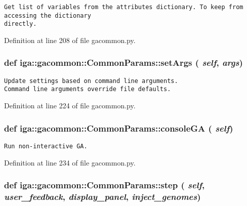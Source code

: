 \footnotesize\begin{verbatim}
Get list of variables from the attributes dictionary. To keep from accessing the dictionary
directly.
\end{verbatim}
\normalsize
 

Definition at line 208 of file gacommon.py.
\subsubsection{\setlength{\rightskip}{0pt plus 5cm}def iga::gacommon::CommonParams::setArgs ( {\em self},  {\em args})}\label{classiga_1_1gacommon_1_1CommonParams_608db5632cdf4b3b8d23e0d9f56b77be}




\footnotesize\begin{verbatim}
Update settings based on command line arguments.
Command line arguments override file defaults.
\end{verbatim}
\normalsize
 

Definition at line 224 of file gacommon.py.
\subsubsection{\setlength{\rightskip}{0pt plus 5cm}def iga::gacommon::CommonParams::consoleGA ( {\em self})}\label{classiga_1_1gacommon_1_1CommonParams_d12a76bc5f7fac648214ad898aaa0d38}




\footnotesize\begin{verbatim}
Run non-interactive GA.
\end{verbatim}
\normalsize
 

Definition at line 234 of file gacommon.py.
\subsubsection{\setlength{\rightskip}{0pt plus 5cm}def iga::gacommon::CommonParams::step ( {\em self},  {\em user\_\-feedback},  {\em display\_\-panel},  {\em inject\_\-genomes})}\label{classiga_1_1gacommon_1_1CommonParams_95813ad875f6955cbe84fa0fe3d84ecf}




